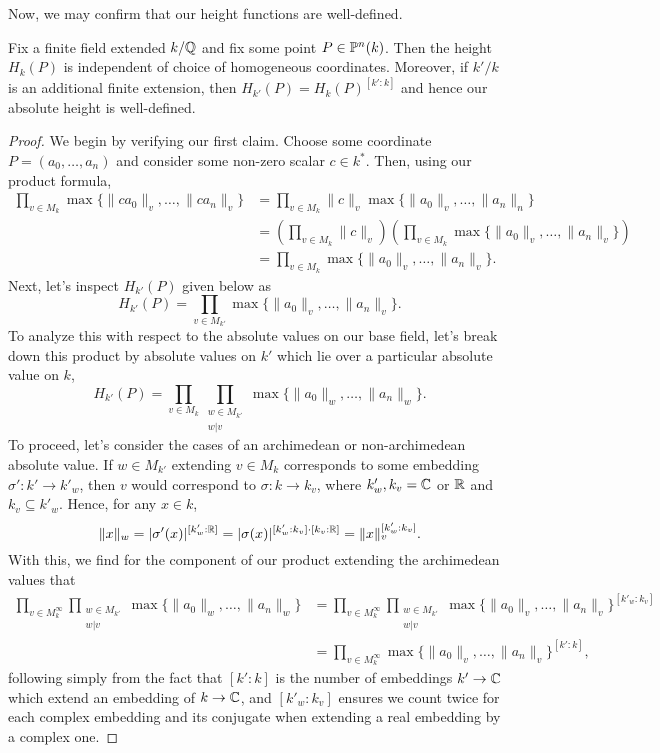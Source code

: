 Now, we may confirm that our height functions are well-defined.

\begin{proposition}
    Fix a finite field extended $k/\mathbb{Q}$ and fix some point $P \in \mathbb{P}^n(k)$.
    Then the height $H_k(P)$ is independent of choice of homogeneous coordinates.
    Moreover, if $k'/ k$ is an additional finite extension,
    then $H_{k'}(P) = H_k(P)^{[k' : k]}$ and hence our absolute height is well-defined.
\end{proposition}

\begin{proof}
    We begin by verifying our first claim. 
    Choose some coordinate $P = (a_0, \ldots, a_n)$ and consider some non-zero scalar $c \in k^*$.
    Then, using our product formula,
    \begin{align*}
        \prod_{v \in M_k} \max \{\|ca_0\|_v, \ldots, \|ca_n\|_v\}
        & = \prod_{v \in M_k} \|c\|_v \max\{\|a_0\|_v, \ldots, \|a_n\|_n\} \\
        & = \left(
            \prod_{v \in M_k} \|c\|_v
        \right) \left(
            \prod_{v \in M_k}\max \{\|a_0\|_v, \ldots, \|a_n\|_v\}
        \right) \\
        & = \prod_{v \in M_k}\max \{\|a_0\|_v, \ldots, \|a_n\|_v\}.
    \end{align*}
    Next, let's inspect $H_{k'}(P)$ given below as 
    \[
        H_{k'}(P) = \prod_{v \in M_{k'}} \max\{\|a_0\|_v, \ldots, \|a_n\|_v\}.
    \]
    To analyze this with respect to the absolute values on our base field, 
    let's break down this product by absolute values on $k'$ which lie over a particular absolute value on $k$,
    \[
        H_{k'}(P) = \prod_{v \in M_k} \prod_{\substack{ w \in M_{k'} \\ w | v}}
        \max\{\|a_0\|_w, \ldots, \|a_n\|_w\}.
    \]
    To proceed, let's consider the cases of an archimedean or non-archimedean absolute value.
    If $w \in M_{k'}$ extending $v \in M_k$ corresponds to some embedding $\sigma' : k' \to k'_w$,
    then $v$ would correspond to $\sigma : k \to k_v$,
    where $k'_w, k_v = \mathbb{C}$ or $\mathbb{R}$ and $k_v \subseteq k'_w$.
    Hence, for any $x \in k$,
    \[
        \|x\|_w 
        = |\sigma'(x)|^{[k'_w : \mathbb{R}]}
        = |\sigma(x)|^{[k'_w : k_v] \cdot [k_v : \mathbb{R}]}
        = \|x\|_v^{[k'_w : k_v]}.
    \]
    With this, we find for the component of our product extending the archimedean values that
    \begin{align*}
        \prod_{v \in M_k^\infty} \prod_{\substack{ w \in M_{k'} \\ w | v}}
        \max\{\|a_0\|_w, \ldots, \|a_n\|_w\}
        & = \prod_{v \in M_k^\infty} \prod_{\substack{ w \in M_{k'} \\ w | v}}
            \max\{\|a_0\|_v, \ldots, \|a_n\|_v\}^{[k'_w : k_v]} \\
        & = \prod_{v \in M_k^\infty } \max\{\|a_0\|_v, \ldots, \|a_n\|_v\}^{[k' : k]},
    \end{align*}
    following simply from the fact that $[k' : k]$ is the number of embeddings $k' \to \mathbb{C}$ which extend an embedding of $k \to \mathbb{C}$,
    and $[k'_w : k_v]$ ensures we count twice for each complex embedding and its conjugate when extending a real embedding by a complex one.


\end{proof}
